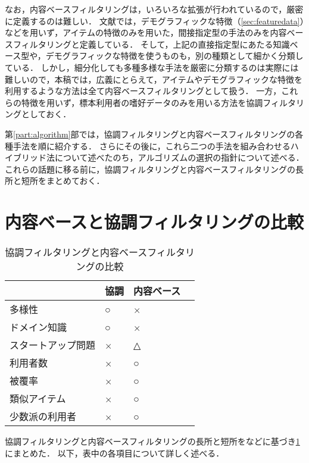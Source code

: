 なお，内容ベースフィルタリングは，いろいろな拡張が行われているので，厳密に定義するのは難しい．
文献\cite{ej:048}では，デモグラフィックな特徴（\ref{sec:featuredata}）などを用いず，アイテムの特徴のみを用いた，間接指定型の手法のみを内容ベースフィルタリングと定義している．
そして，上記の直接指定型にあたる知識ベース型や，デモグラフィックな特徴を使うものも，別の種類として細かく分類している．
しかし，細分化しても多種多様な手法を厳密に分類するのは実際には難しいので，本稿では，広義にとらえて，アイテムやデモグラフィックな特徴を利用するような方法は全て内容ベースフィルタリングとして扱う．
一方，これらの特徴を用いず，標本利用者の嗜好データのみを用いる方法を協調フィルタリングとしておく．

第\ref{part:algorithm}部では，協調フィルタリングと内容ベースフィルタリングの各種手法を順に紹介する．
さらにその後に，これら二つの手法を組み合わせるハイブリッド法について述べたのち，アルゴリズムの選択の指針について述べる．
これらの話題に移る前に，協調フィルタリングと内容ベースフィルタリングの長所と短所をまとめておく．

\section{内容ベースと協調フィルタリングの比較}
\label{sec:cfcbfcomp}

\begin{table}
\centering
\caption{協調フィルタリングと内容ベースフィルタリングの比較}
\label{tab:cfcbfcomp}
\begin{tabular}{l@{\qquad}>{\centering}p{}>{\centering}p{}p{0pt}}\toprule
 & 協調 & 内容ベース & \\\midrule
多様性 & ○ & × & \\
ドメイン知識 & ○ & × & \\
スタートアップ問題 & × & △ & \\
利用者数 & × & ○ & \\
被覆率 & × & ○ & \\
類似アイテム & × & ○ & \\
少数派の利用者 & × & ○ & \\
\bottomrule
\end{tabular}
\end{table}

協調フィルタリングと内容ベースフィルタリングの長所と短所を\cite{macm:97:02,ej:048}などに基づき\ref{tab:cfcbfcomp}にまとめた．
以下，表中の各項目について詳しく述べる．

